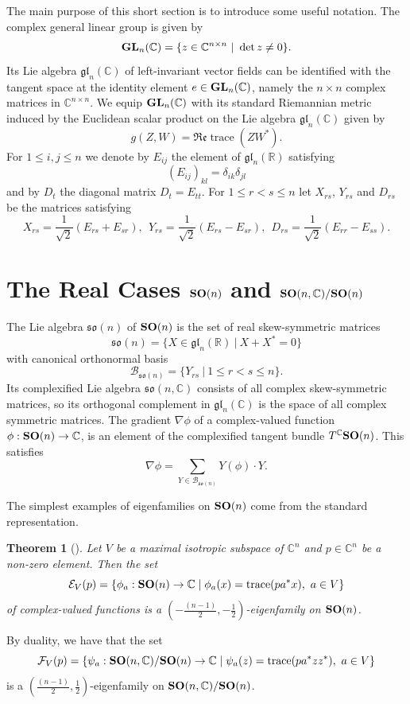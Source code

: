 \documentclass[11pt,reqno]{amsart}
\theoremstyle{plain}
\newtheorem{theorem}                 {Theorem}[section]
\theoremstyle{definition}
\numberwithin{equation}{section}
\def \rn{{\mathbb R}}
\def \cn{{\mathbb C}}
\def \B{\mathcal B}
\def \E{\mathcal E}
\def \F{\mathcal F}
\def\Re{\mathfrak R\mathfrak e}
\def \glr#1{\mathfrak{gl}_{#1}(\rn)}
\def \GLC#1{\text{\bf GL}_{#1}(\cn)}
\def \glc#1{\mathfrak{gl}_{#1}(\cn)}
\def \SO#1{\text{\bf SO}(#1)}
\def \so#1{\mathfrak{so}(#1)}
\def \SOC#1{\text{\bf SO}(#1,\cn)}
\def \soc#1{\mathfrak{so}(#1,\cn)}
\DeclareMathOperator{\trace}{trace}
\numberwithin{equation}{section}
\begin{document}
The main purpose of this short section is to introduce some useful notation.  The complex general linear group is given by 
$$\GLC{n}=\{z\in\cn^{n\times n}\ |\ \det z \neq 0\}.$$
Its Lie algebra $\glc n$ of left-invariant vector fields can be identified with the tangent space at the identity element $e\in\GLC n$, namely the $n\times n$ complex matrices in $\cn^{n\times n}$.  We equip $\GLC n$ with its standard Riemannian metric induced by the Euclidean scalar product
on the Lie algebra $\glc n$ given by
$$g(Z,W)=\Re\trace (ZW^*).$$  
For $1\le i,j\le n$ we denote by $E_{ij}$ the element of $\glr n$ satisfying
$$(E_{ij})_{kl}=\delta_{ik}\delta_{jl}$$ 
and by $D_t$ the diagonal matrix $D_t=E_{tt}$. For $1\le r<s\le n$ let $X_{rs}$, $Y_{rs}$ and $D_{rs}$ be the matrices satisfying
$$X_{rs}=\frac 1{\sqrt 2}(E_{rs}+E_{sr}),\ \ Y_{rs}=\frac
1{\sqrt 2}(E_{rs}-E_{sr}), \ \ D_{rs} = \frac{1}{\sqrt 2} (E_{rr}-E_{ss}).$$ 




\section{The Real Cases $\SO n$ and $\SOC n/\SO n$}
\label{section-real-cases}



The Lie algebra $\so n$ of $\SO n$ is the set of real  skew-symmetric matrices
$$\so n=\{X\in\glr n\ |\ X+X^*=0\}$$ 
with canonical orthonormal basis
$$\B_{\so n}=\{Y_{rs}\ |\ 1\le r<s\le n\}.$$
Its complexified Lie algebra $\soc{n}$ consists of all complex skew-symmetric matrices, so its orthogonal complement in $\glc{n}$ is the space of all complex symmetric matrices.
The gradient $\nabla\phi$ of a complex-valued function $\phi:\SO n\to\cn$, is an element of the complexified tangent bundle $T^\cn\SO n$.  This satisfies 
$$\nabla\phi=\sum_{Y\in\B_{\so n}}Y(\phi)\cdot Y.$$


The simplest examples of eigenfamilies on $\SO{n}$ come from the standard representation.
\begin{theorem}[\cite{Gud-Sak-1}]
	Let $V$ be a maximal isotropic subspace of $\cn^n$ and $p \in \cn^n$ be a non-zero element. Then the set 
	$$ \E_V(p) = \{ \phi_a : \SO{n} \to \cn \mid \phi_a (x)= \trace (p a^* x), \ a\in V \}$$
	of complex-valued functions is a $(-\tfrac{(n-1)}{2},-\tfrac{1}{2})$-eigenfamily on $\SO{n}$.
	\end{theorem}
By duality, we have that the set
$$ \F_V(p) = \{ \psi_a : \SOC{n}/\SO{n} \to \cn \mid \psi_a(z) = \trace (p a^* {z} z^{*}), \ a\in V \}$$
 is a  $(\tfrac{(n-1)}{2},\tfrac{1}{2})$-eigenfamily on $\SOC{n}/\SO{n}$.
 
\end{document}

